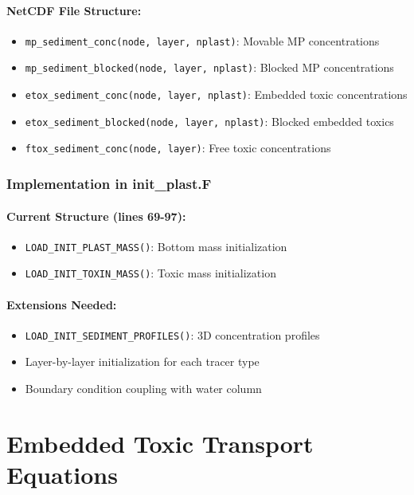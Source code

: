 \documentclass[11pt,a4paper]{article}
\begin{document}
\paragraph{NetCDF File Structure:}
\begin{itemize}
    \item \texttt{mp\_sediment\_conc(node, layer, nplast)}: Movable MP concentrations
    \item \texttt{mp\_sediment\_blocked(node, layer, nplast)}: Blocked MP concentrations  
    \item \texttt{etox\_sediment\_conc(node, layer, nplast)}: Embedded toxic concentrations
    \item \texttt{etox\_sediment\_blocked(node, layer, nplast)}: Blocked embedded toxics
    \item \texttt{ftox\_sediment\_conc(node, layer)}: Free toxic concentrations
\end{itemize}

\subsubsection{Implementation in init\_plast.F}

\paragraph{Current Structure (lines 69-97):}
\begin{itemize}
    \item \texttt{LOAD\_INIT\_PLAST\_MASS()}: Bottom mass initialization
    \item \texttt{LOAD\_INIT\_TOXIN\_MASS()}: Toxic mass initialization
\end{itemize}

\paragraph{Extensions Needed:}
\begin{itemize}
    \item \texttt{LOAD\_INIT\_SEDIMENT\_PROFILES()}: 3D concentration profiles
    \item Layer-by-layer initialization for each tracer type
    \item Boundary condition coupling with water column
\end{itemize}

\section{Embedded Toxic Transport Equations}
\end{document}
